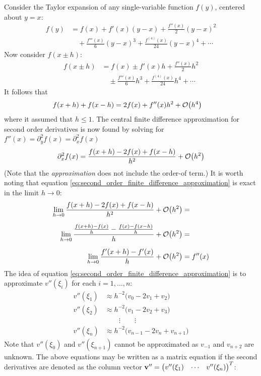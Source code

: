 \documentclass[reprint,english]{revtex4-1}
\begin{document}
Consider the Taylor expansion of any single-variable function \(f(y)\), centered about \(y=x\):
\begin{align}
f(y)&= f(x)+f'(x)(y-x)+\frac{f''(x)}{2}(y-x)^2\nonumber\\
&\quad +\frac{f'''(x)}{6}(y-x)^3+\frac{f^{(4)}(x)}{24}(y-x)^4+\cdots\label{eq:second_order_taylor_expansion}
\end{align}
Now consider \(f(x\pm h)\):
\begin{align}
f(x\pm h)&=f(x)\pm f'(x)h+\frac{f''(x)}{2}h^2\nonumber\\
&\quad \pm\frac{f'''(x)}{6}h^3+\frac{f^{(4)}(x)}{24}h^4+\cdots
\end{align}
It follows that
\begin{align*}
&f(x+h)+f(x-h)=2f(x)+f''(x)h^2+\order{h^4}
\end{align*}
where it assumed that \(h\leq1\). The central finite difference approximation for second order derivatives is now found by solving for \(f''(x)=\partial_y^2f(x)=\partial_x^2f(x)\)
\begin{equation}\label{eq:second_order_finite_difference_approximation}
\partial_x^2f(x)=\frac{f(x+h)-2f(x)+f(x-h)}{h^2}+\order{h^2}
\end{equation}
(Note that the \emph{approximation} does not include the order-of term.) It is worth noting that equation \eqref{eq:second_order_finite_difference_approximation} is exact in the limit \(h\to0\):
\begin{align*}
\lim_{h\to0}\frac{f(x+h)-2f(x)+f(x-h)}{h^2}+\order{h^2}&=\\[2mm]
\lim_{h\to0}\frac{\frac{f(x+h)-f(x)}{h}-\frac{f(x)-f(x-h)}{h}}{h}+\order{h^2}&=\\[2mm]
\lim_{h\to0}\frac{f'(x+h)-f'(x)}{h}+\order{h^2}&=f''(x)
\end{align*}
The idea of equation \eqref{eq:second_order_finite_difference_approximation} is to approximate \(v''(\xi_i)\) for each \(i=1,\ldots,n\):
\begin{align*}
v''(\xi_1)&\approx h^{-2}\big(v_0-2v_1+v_2\big)\\
v''(\xi_2)&\approx h^{-2}\big(v_1-2v_2+v_3\big)\\
&\qquad\vdots\qquad\vdots\qquad\\
v''(\xi_n)&\approx h^{-2}\big(v_{n-1}-2v_n+v_{n+1}\big)
\end{align*}
Note that \(v''(\xi_0)\) and \(v''(\xi_{n+1})\) cannot be approximated as \(v_{-1}\) and \(v_{n+2}\) are unknown. The above equations may be written as a matrix equation if the second derivatives are denoted as the column vector \(\vb{v}''=\mqty(v''(\xi_1)&\cdots&v''(\xi_n))^T\):
\end{document}
